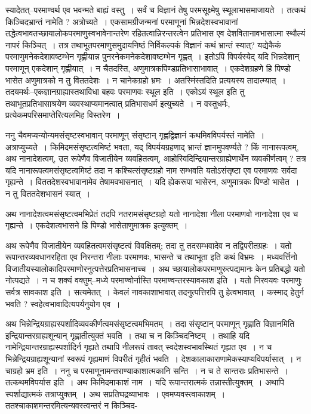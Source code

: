 \documentclass[article,12pt,a4paper]{memoir}
\begin{document}
	  \pstart स्यादेतत्--परमाण्वर्थ एव भवन्मते बाह्यं वस्तु । सर्वं च विज्ञानं तेषु परमसूक्ष्मेषु  \leavevmode{} स्थूलाभासमाजायते । तत्कथं किञ्चिदभ्रान्तं नामेति ? अत्रोच्यते । एकसामग्रीजन्मनां परमाणूनां भिन्नदेशस्वभावानां तद्धेत्वभावतच्छायालोकपरमाणुस्वभावेनान्तरेण रहितत्वान्निरन्तरत्वेन प्रतिभास एव देशवितानावभासात्मा स्थौल्यं नापरं किञ्चित् । तत्र तथाभूतपरमाणुसमुदायनिष्ठं निर्विकल्पकं विज्ञानं कथं भ्रान्तं स्यात्? यद्येकैकं परमाणुमनेकदेशावष्टम्भेन गृह्णीयान्न पुनरनेकमनेकदेशावष्टम्भेन गृह्णत् । इतोऽपि विपर्यस्येद् यदि भिन्नदेशान् परमाणून् एकदेशान् गृह्णीयात् । न चैतदस्ति, अणुमात्रकपिण्डप्रतिभासाभावात् । एकदेशग्रहणे हि पिण्डो भासेत अणुमात्रको न तु विततदेशः । न चानेकग्रहो भ्रमः । अतस्मिंस्तदिति प्रत्ययस्य तादात्म्यात् । तदयमर्थः--एकज्ञानग्राह्यास्तथाविधा बहवः परमाणवः स्थूल इति । एकोऽयं स्थूल इति तु तथाभूतप्रतिभासाश्रयेण व्यवस्थाप्यमानत्वात् प्रतिभासधर्म इत्युच्यते । न वस्तुधर्मः, प्रत्येकमपरिसमाप्तेरित्यलमिह विस्तरेण ।
	\pend
      

	  \pstart ननु चैवमप्यन्योन्यमसंसृष्टस्वभावान् परमाणून् संसृष्टान् गृह्णद्विज्ञानं कथमिवविपर्यस्तं नामेति । अत्राप्युच्यते । किमिदमसंसृष्टत्वमिष्टं भवता, यद् विपर्ययग्रहणाद् भ्रान्तं ज्ञानमुपवर्ण्यते ? किं नानारूपत्वम्, अथ नानादेशत्वम्, उत रूपेणैव विजातीयेन व्यवहितत्वम्, आहोस्विदिन्द्रियान्तरग्राह्येणार्थेन व्यवकीर्णत्वम् ? तत्र यदि नानारूपत्वमसंसृष्टत्वमिष्टं तदा न कश्चित्संसृष्टग्रहो नाम सम्भवति यतोऽसंसृष्टा एव परमाणवः सर्वदा गृह्यन्ते । विततदेशस्वभावानामेव तेषामवभासनात् । यदि ह्येकरूपा भासेरन, अणुमात्रकः पिण्डो भासेत । न तु विततदेशभासनं स्यात् ।
	\pend
      

	  \pstart अथ नानादेशत्वमसंसृष्टत्वमभिप्रेतं तदपि नतरामसंसृष्टग्रहो यतो नानादेशा नीला परमाणवो नानादेशा एव च गृह्यन्ते । एकदेशत्वभासने हि पिण्डो भासेताणुमात्रक इत्युक्तम् ।
	\pend
      

	  \pstart अथ रूपेणैव विजातीयेन व्यवहितत्वमसंसृष्टत्वं विवक्षितम्; तदा तु तदसम्भवादेव न तद्विपरीतग्रहः । यतो रूपान्तरव्यवधानरहिता एव निरन्तरा नीलाः परमाणवः, भासन्ते च तथाभूता इति कथं विभ्रमः । मध्यवर्त्तिनो विजातीयस्यालोकादिपरमाणोरनुत्पत्तेरप्रतिभासनाच्च । अथ च्छायालोकपरमाणुरुत्पद्यमानः केन प्रतिबद्धो यतो नोत्पद्यते । न च शक्यं वक्तुम्--मध्ये परमाण्वोर्नास्ति परमाण्वन्तरस्यावकाश इति । यतो निरवयवः परमाणुः सर्वत्र सावकाश इति । सत्यमेतत् । केवलं नावकाशाभावात् तदनुत्पत्तिरपि तु हेत्वभावात् । कस्माद् हेतुर्न भवति ? स्वहे\leavevmode{}त्वभावादित्यपर्यनुयोग एव ।
	\pend
      

	  \pstart अथ भिन्नेन्द्रियग्राह्यस्पर्शादिव्यवकीर्णत्वमसंसृष्टत्वमभिमतम् । तदा संसृष्टान् परमाणून् गृह्णाति विज्ञानमिति इन्द्रियान्तरग्राह्यशून्यान् गृह्णातीत्युक्तं भवति । तथा च न किञ्चिदनिष्टम् । तथाहि यदि नामेन्द्रियान्तरग्राह्यस्पर्शादिर्न गृह्यते तथापि नीलरूपं तावत् स्वदेशस्वभावस्थितं गृह्यत एव । न च भिन्नेन्द्रियग्राह्यशून्यानां स्वरूपं गृह्यमाणं विपरीतं गृहीतं भवति । देशकालाकाराणामेकस्याप्यविपर्यासात् । न चाग्रहो भ्रम इति । ननु च परमाणूनामन्तराण्याकाशात्मकानि सन्ति । न च ते सान्तराः प्रतिभासन्ते । तत्कथमविपर्यास इति । अथ किमिदमाकाशं नाम । यदि रूपान्तरात्मकं तन्नास्तीत्युक्तम् । अथापि स्पर्शाद्यात्मकं तत्राप्युक्तम् । अथ सप्रतिघद्रव्याभावः । एवमप्यवस्त्वाकाशम् । ततश्चाकाशमन्तरमित्यन्यवस्त्वन्तरं न किञ्चिद- \leavevmode{} 
	  
\end{document}
